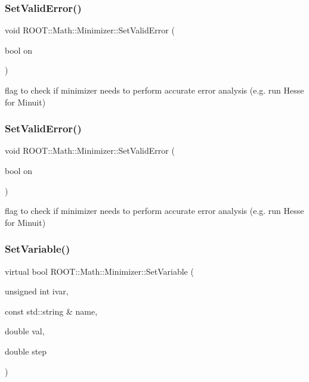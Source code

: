 \subsubsection{\texorpdfstring{SetValidError()}{SetValidError()}\hspace{0.1cm}{\footnotesize\ttfamily [1/2]}}
{\footnotesize\ttfamily void R\+O\+O\+T\+::\+Math\+::\+Minimizer\+::\+Set\+Valid\+Error (\begin{DoxyParamCaption}\item[{bool}]{on }\end{DoxyParamCaption})\hspace{0.3cm}{\ttfamily [inline]}}



flag to check if minimizer needs to perform accurate error analysis (e.\+g. run Hesse for Minuit) 

\mbox{\label{classROOT_1_1Math_1_1Minimizer_a31289e6911a86aba956d0050cee2555b}} 
\subsubsection{\texorpdfstring{SetValidError()}{SetValidError()}\hspace{0.1cm}{\footnotesize\ttfamily [2/2]}}
{\footnotesize\ttfamily void R\+O\+O\+T\+::\+Math\+::\+Minimizer\+::\+Set\+Valid\+Error (\begin{DoxyParamCaption}\item[{bool}]{on }\end{DoxyParamCaption})\hspace{0.3cm}{\ttfamily [inline]}}



flag to check if minimizer needs to perform accurate error analysis (e.\+g. run Hesse for Minuit) 

\mbox{\label{classROOT_1_1Math_1_1Minimizer_a8661a2ac86372602f32f97b3d9262421}} 
\subsubsection{\texorpdfstring{SetVariable()}{SetVariable()}\hspace{0.1cm}{\footnotesize\ttfamily [1/2]}}
{\footnotesize\ttfamily virtual bool R\+O\+O\+T\+::\+Math\+::\+Minimizer\+::\+Set\+Variable (\begin{DoxyParamCaption}\item[{unsigned int}]{ivar,  }\item[{const std\+::string \&}]{name,  }\item[{double}]{val,  }\item[{double}]{step }\end{DoxyParamCaption})\hspace{0.3cm}{\ttfamily [pure virtual]}}



